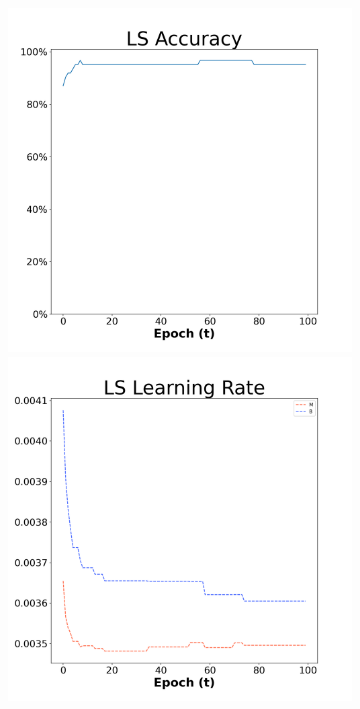 \begin{figure}[H]
    \centering %
\begin{subfigure}{0.3\textwidth}
  \includegraphics[width=\linewidth]{images/exper1/breast/LS_0.01_acc.png}
    \includegraphics[width=\linewidth]{images/exper1/breast/LS_0.01_lr.png}

\end{subfigure}
\end{figure}
